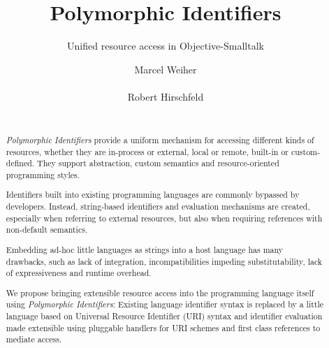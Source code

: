 \documentclass{acm_proc_article-sp}
\begin{document}

\linespread{0.9}




\title{Polymorphic Identifiers}
\subtitle{Unified resource access in Objective-Smalltalk}



\author{
\alignauthor Marcel Weiher\\
       \\
\alignauthor Robert Hirschfeld\\
       \\
       \email{}
}

\maketitle

\begin{abstract}

\emph{Polymorphic Identifiers} provide a uniform mechanism for accessing different kinds of resources,
whether they are in-process or external, local or remote, built-in or custom-defined.  They
support abstraction, custom semantics and resource-oriented programming styles.

Identifiers built into existing programming languages are commonly bypassed by developers.
Instead, string-based identifiers and evaluation mechanisms are created,
especially when referring to external resources, but also when requiring references with
non-default semantics.


Embedding ad-hoc little languages
as strings into a host language has many drawbacks, such as
lack of integration, incompatibilities impeding substitutability,
lack of expressiveness and runtime overhead.

We propose bringing extensible resource access  into
the programming language itself using \emph{Polymorphic Identifiers}:    Existing language identifier syntax is
replaced by a little language based on Universal Resource Identifier (URI)
syntax and identifier evaluation made extensible using pluggable handlers for URI schemes and first
class references to mediate access.
  


\end{abstract}
\end{document}
